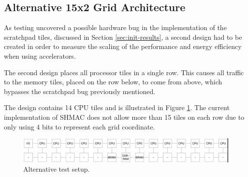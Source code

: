 \subsection{Alternative 15x2 Grid Architecture}
As testing uncovered a possible hardware bug in the implementation of the scratchpad tiles,
discussed in Section \ref{sec:init-results}, a second design had to be created
in order to measure the scaling of the performance and energy efficiency when using accelerators.

The second design places all processor tiles in a single row. This causes all traffic
to the memory tiles, placed on the row below, to come from above, which bypasses the
scratchpad bug previously mentioned.

The design contains 14 CPU tiles and is illustrated in Figure \ref{fig:15x2}. The
current implementation of SHMAC does not allow more than 15 tiles on each row due
to only using 4 bits to represent each grid coordinate.

\begin{figure}[htb]
    \centering
    \includegraphics[width=1.0\textwidth]{Figures/Measurements/15x2}
    \caption{Alternative test setup.}
    \label{fig:15x2}
\end{figure}

